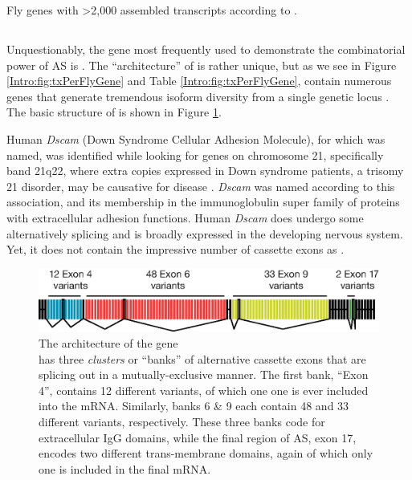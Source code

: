     \begin{table} %
      \caption{Fly genes with >2,000 assembled transcripts according to \citep{Brown2014}.}
      \label{Intro:tab:FlyGenesWithManyTx}
      
      \end{table}

  \subsection{\flies{} \dscam{}}\label{Intro:subsec:Dscam}

    Unquestionably, the gene most frequently used to demonstrate the combinatorial power of AS is \flies{} \dscam{}. The ``architecture'' of \dscam{} is rather unique, but as we see in Figure \ref{Intro:fig:txPerFlyGene} and Table \ref{Intro:fig:txPerFlyGene}, \flies{} contain numerous genes that generate tremendous isoform diversity from a single genetic locus \citep{Brown2014}. The basic structure of \dscam{} is shown in Figure \ref{Intro:fig:DscamArch}.

    Human \textit{Dscam} (Down Syndrome Cellular Adhesion Molecule), for which \dscam{} was named, was identified while looking for genes on chromosome 21, specifically band 21q22, where extra copies expressed in Down syndrome patients, a trisomy 21 disorder, may be causative for disease \citep{Yamakawa1998a}. \textit{Dscam} was named according to this association, and its membership in the immunoglobulin super family of proteins with extracellular adhesion functions. Human \textit{Dscam} does undergo some alternatively splicing and is broadly expressed in the developing nervous system. Yet, it does not contain the impressive number of cassette exons as \dscam{}.

    \begin{figure} %
      \centering 
      \includegraphics{Figures/Intro/DscamArch.eps}
      \caption[The architecture of the \flies{} gene \dscam{}]
      {
        The architecture of the \flies{} gene \dscam{}\\[0.25cm]
        \dscam{} has three \textit{clusters} or ``banks'' of alternative cassette exons that are splicing out in a mutually-exclusive manner. The first bank, ``Exon 4'', contains 12 different variants, of which one one is ever included into the mRNA. Similarly, banks 6 \& 9 each contain 48 and 33 different variants, respectively. These three banks code for extracellular IgG domains, while the final region of AS, exon 17, encodes two different trans-membrane domains, again of which only one is included in the final mRNA.
          }
        \label{Intro:fig:DscamArch}
        \end{figure}


